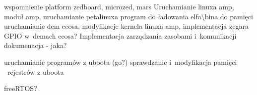   	
  	
  	wspomnienie platform zedboard, microzed, mars
  	Uruchamianie linuxa amp, moduł amp, 
  	uruchamianie petalinuxa
  	program do ładowania elfa\textbackslash bina do pamięci
  	uruchamianie dem ecosa, modyfikacje kernela linuxa amp, implementacja zegara GPIO w~demach ecosa?
  	Implementacja zarządzania zasobami i~komunikacji
  	dokumenacja - jaka?
  	
  	
  	
  	uruchamianie programów z uboota (go?)
  	sprawdzanie i~modyfikacja pamięci \ rejestrów z uboota
  	
  	freeRTOS?
  	
  	
